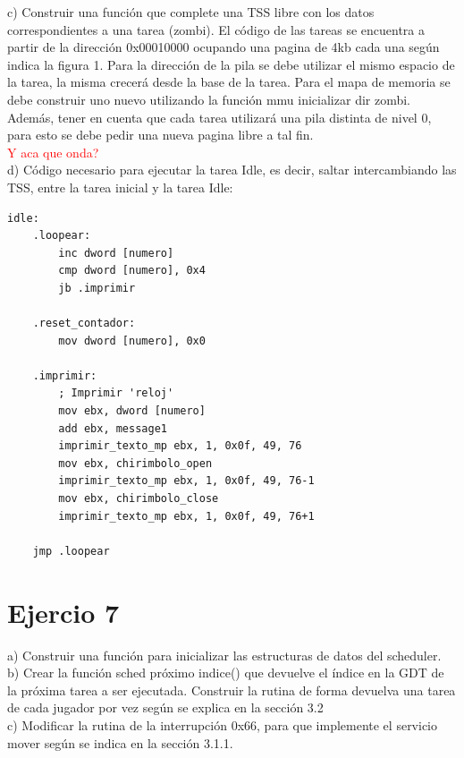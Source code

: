 \documentclass[a4paper]{article}
\begin{document}
{\large c)} Construir una funci\'on que complete una TSS libre con los datos correspondientes a una
tarea (zombi). El c\'odigo de las tareas se encuentra a partir de la direcci\'on 0x00010000
ocupando una pagina de 4kb cada una seg\'un indica la figura 1. Para la direcci\'on de la
pila se debe utilizar el mismo espacio de la tarea, la misma crecer\'a desde la base de la tarea. Para el mapa de memoria se debe construir uno nuevo utilizando la funci\'on mmu inicializar dir zombi. Adem\'as, tener en cuenta que cada tarea utilizar\'a una pila distinta de nivel 0, para esto se debe pedir una nueva pagina libre a tal fin. \\

\textcolor{red}{Y aca que onda?}\\

{\large d)} C\'odigo necesario para ejecutar la tarea Idle, es decir, saltar intercambiando las
TSS, entre la tarea inicial y la tarea Idle:

\begin{codesnippet}
\begin{verbatim}
idle:
    .loopear:
        inc dword [numero]
        cmp dword [numero], 0x4
        jb .imprimir

    .reset_contador:
        mov dword [numero], 0x0

    .imprimir:
        ; Imprimir 'reloj'
        mov ebx, dword [numero]
        add ebx, message1
        imprimir_texto_mp ebx, 1, 0x0f, 49, 76
        mov ebx, chirimbolo_open
        imprimir_texto_mp ebx, 1, 0x0f, 49, 76-1
        mov ebx, chirimbolo_close
        imprimir_texto_mp ebx, 1, 0x0f, 49, 76+1

    jmp .loopear
\end{verbatim}
\end{codesnippet}

\newpage
\section{Ejercio 7}
{\large a)} Construir una funci\'on para inicializar las estructuras de datos del scheduler.\\

{\large b)} Crear la funci\'on sched pr\'oximo indice() que devuelve el \'indice en la GDT de la pr\'oxima
tarea a ser ejecutada. Construir la rutina de forma devuelva una tarea de cada jugador
por vez seg\'un se explica en la secci\'on 3.2\\

{\large c)} Modificar la rutina de la interrupci\'on 0x66, para que implemente el servicio mover seg\'un
se indica en la secci\'on 3.1.1.\\
\end{document}
